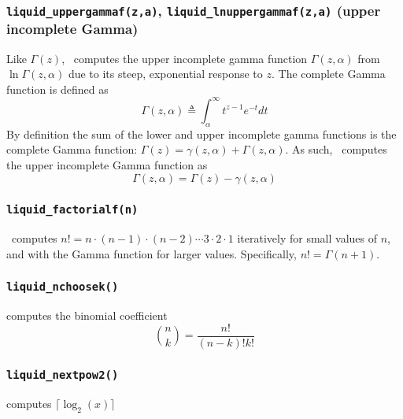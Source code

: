 % 
%
\subsubsection{{\tt liquid\_uppergammaf(z,a)},
               {\tt liquid\_lnuppergammaf(z,a)}
               (upper incomplete Gamma)}
\label{module:math:transcendentals:uppergamma}
Like $\Gamma(z)$,
\liquid\ computes the upper incomplete gamma function
$\Gamma(z,\alpha)$ from $\ln\Gamma(z,\alpha)$
due to its steep, exponential response to $z$.
The complete Gamma function is defined as
%
\begin{equation}
\label{eqn:math:uppergamma}
    \Gamma(z,\alpha) \triangleq \int_\alpha^\infty{t^{z-1}e^{-t}dt}
\end{equation}
%
By definition the sum of the lower and upper incomplete gamma functions
is the complete Gamma function:
$\Gamma(z) = \gamma(z,\alpha) + \Gamma(z,\alpha)$.
As such,
\liquid\ computes the upper incomplete Gamma function as
%
\begin{equation}
\label{eqn:math:lnuppergamma}
    \Gamma(z,\alpha) = \Gamma(z) - \gamma(z,\alpha)
\end{equation}
%



% 
%
\subsubsection{{\tt liquid\_factorialf(n)}}
\label{module:math:transcendentals:factorial}
\liquid\ computes $n!=n\cdot(n-1)\cdot(n-2)\cdots3\cdot2\cdot1$
iteratively for small values of $n$, and with the Gamma function for
larger values.
Specifically, $n! = \Gamma(n+1)$.

%
\subsubsection{{\tt liquid\_nchoosek()}}
\label{module:math:transcendentals:nchoosek}
computes the binomial coefficient
%
\begin{equation}
\label{eqn:math:nchoosek}
    {n \choose k} = \frac{n!}{(n-k)!k!}
\end{equation}

\subsubsection{{\tt liquid\_nextpow2()}}
\label{module:math:transcendentals:nextpow2}
    computes $\lceil \log_2(x) \rceil$




